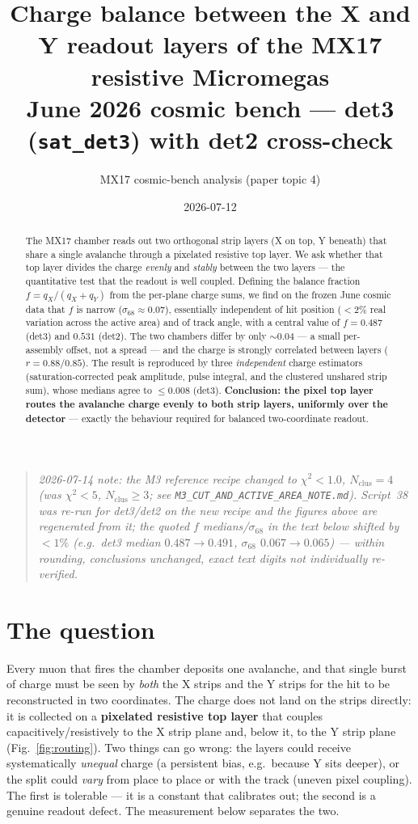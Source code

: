 \documentclass[11pt]{article}
\title{\vspace{-1.5em}Charge balance between the X and Y readout layers of the
MX17 resistive Micromegas\\
\large June 2026 cosmic bench --- det3 (\texttt{sat\_det3}) with det2 cross-check}
\author{MX17 cosmic-bench analysis (paper topic 4)}
\date{2026-07-12}
\newcommand{\qx}{q_X}
\newcommand{\qy}{q_Y}
\newcommand{\fbal}{f}
\begin{document}
\maketitle
\vspace{-1.5em}

\begin{quote}\small\itshape
2026-07-14 note: the M3 reference recipe changed to $\chi^2<1.0$, $N_\mathrm{clus}=4$
(was $\chi^2<5$, $N_\mathrm{clus}\ge3$; see \texttt{M3\_CUT\_AND\_ACTIVE\_AREA\_NOTE.md}).
Script~38 was re-run for det3/det2 on the new recipe and the figures above are
regenerated from it; the quoted $\fbal$ medians/$\sigma_{68}$ in the text below shifted
by $<1\%$ (e.g.\ det3 median $0.487\to0.491$, $\sigma_{68}$ $0.067\to0.065$) --- within
rounding, conclusions unchanged, exact text digits not individually re-verified.
\end{quote}

\begin{abstract}
\noindent The MX17 chamber reads out two orthogonal strip layers (X on top, Y
beneath) that share a single avalanche through a pixelated resistive top layer.
We ask whether that top layer divides the charge \emph{evenly} and
\emph{stably} between the two layers --- the quantitative test that the readout
is well coupled. Defining the balance fraction $\fbal=\qx/(\qx+\qy)$ from the
per-plane charge sums, we find on the frozen June cosmic data that $\fbal$ is
narrow ($\sigma_{68}\approx0.07$), essentially independent of hit position
($<2\%$ real variation across the active area) and of track angle, with a
central value of $\fbal=0.487$ (det3) and $0.531$ (det2). The two chambers
differ by only ${\sim}0.04$ --- a small per-assembly offset, not a spread ---
and the charge is strongly correlated between layers ($r=0.88/0.85$). The result
is reproduced by three \emph{independent} charge estimators (saturation-corrected
peak amplitude, pulse integral, and the clustered unshared strip sum), whose
medians agree to $\le0.008$ (det3). \textbf{Conclusion: the pixel top layer
routes the avalanche charge evenly to both strip layers, uniformly over the
detector} --- exactly the behaviour required for balanced two-coordinate
readout.
\end{abstract}

\section{The question}
Every muon that fires the chamber deposits one avalanche, and that single burst
of charge must be seen by \emph{both} the X strips and the Y strips for the hit
to be reconstructed in two coordinates. The charge does not land on the strips
directly: it is collected on a \textbf{pixelated resistive top layer} that
couples capacitively/resistively to the X strip plane and, below it, to the Y
strip plane (Fig.~\ref{fig:routing}). Two things can go wrong: the layers could
receive systematically \emph{unequal} charge (a persistent bias, e.g.\ because Y
sits deeper), or the split could \emph{vary} from place to place or with the
track (uneven pixel coupling). The first is tolerable --- it is a constant that
calibrates out; the second is a genuine readout defect. The measurement below
separates the two.
\end{document}
